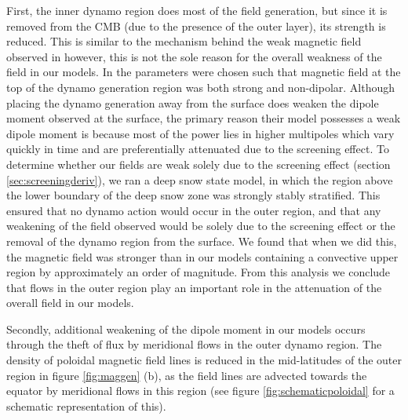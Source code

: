 First, the inner dynamo region does most of the field generation, but since it is removed from the CMB (due to the presence of the outer layer), its strength is reduced. This is similar to the mechanism behind the weak magnetic field observed in \citet{christensen06} however, this is not the sole reason for the overall weakness of the field in our models. In  \citet{christensen06} the parameters were chosen such that magnetic field at the top of the dynamo generation region was both strong and non-dipolar. Although placing the dynamo generation away from the surface does weaken the dipole moment observed at the surface, the primary reason their model possesses a weak dipole moment is because most of the power lies in higher multipoles which vary quickly in time and are preferentially attenuated due to the screening effect. To determine whether our fields are weak solely due to the screening effect (section \ref{sec:screeningderiv}), we ran a deep snow state model, in which the region above the lower boundary of the deep snow zone was strongly stably stratified. This ensured that no dynamo action would occur in the outer region, and that any weakening of the field observed would be solely due to the screening effect or the removal of the dynamo region from the surface. We found that when we did this, the magnetic field was stronger than in our models containing a convective upper region by approximately an order of magnitude. From this analysis we conclude that flows in the outer region play an important role in the attenuation of the overall field in our models.

Secondly, additional weakening of the dipole moment in our models occurs through the theft of flux by meridional flows in the outer dynamo region. The density of poloidal magnetic field lines is reduced in the mid-latitudes of the outer region in figure \ref{fig:maggen} (b), as the field lines are advected towards the equator by meridional flows in this region (see figure \ref{fig:schematicpoloidal} for a schematic representation of this).

